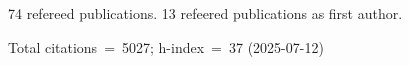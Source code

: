 74 refereed publications. 13 refeered publications as first author.

Total citations~=~5027; h-index~=~37 (2025-07-12)